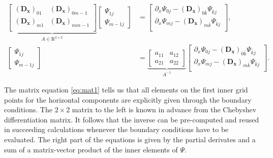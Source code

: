 \begin{align}
\underbrace{\begin{bmatrix} (\mathbf{D_x})_{01} & (\mathbf{D_x})_{0m-1} \\
    (\mathbf{D_x})_{m1} & (\mathbf{D_x})_{mm-1} \\
\end{bmatrix}}_{A \in \mathrm{R}^{2 \times 2}}
\begin{bmatrix} \Psi_{1j} \\ \Psi_{m-1j}
\end{bmatrix} &=
\begin{bmatrix}
\partial_x\Psi_{0j} - (\mathbf{D_x})_{0\bar{k}}\Psi_{\bar{k}j} \\
\partial_x\Psi_{mj} - (\mathbf{D_x})_{m\bar{k}}\Psi_{\bar{k}j} \\
\end{bmatrix}, \nonumber \\
\begin{bmatrix} \Psi_{1j} \\ \Psi_{m-1j}
\end{bmatrix} &=
\underbrace{\begin{bmatrix} a_{11} & a_{12} \\ a_{21} & a_{22} 
\end{bmatrix}}_{A^{-1}}
\begin{bmatrix}
\partial_x\Psi_{0j} - (\mathbf{D_x})_{0\bar{k}}\Psi_{\bar{k}j} \\
\partial_x\Psi_{mj} - (\mathbf{D_x})_{m\bar{k}}\Psi_{\bar{k}j} \\
\end{bmatrix}.
\label{eq:mat1}
\end{align}

The matrix equation \eqref{eq:mat1} tells us that all elements on the first
inner grid points for the horizontal components are explicitly given through
the boundary conditions. The $2 \times 2$ matrix to the left is known in
advance from the Chebyshev differentiation matrix. It follows that the inverse
can be pre-computed and reused in succeeding calculations whenever the boundary
conditions have to be evaluated. The right part of the equations is given by
the partial derivates and a sum of a matrix-vector product of the inner
elements of $\Psi$.

